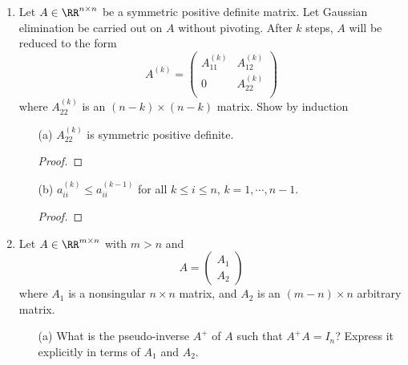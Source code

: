 \documentclass[11pt]{article}
\begin{document}
\begin{enumerate}
    \item %
        Let $A \in \RR^{n \times n}$ be a symmetric positive definite matrix.
        Let Gaussian elimination be carried out on $A$ without pivoting.
        After $k$ steps, $A$ will be reduced to the form
        \[
            A^{(k)} =
            \begin{pmatrix}
                A_{11}^{(k)} & A_{12}^{(k)} \\
                0            & A_{22}^{(k)} \\
            \end{pmatrix}
        \]
        where $A_{22}^{(k)}$ is an $(n - k) \times (n - k)$ matrix.
        Show by induction
        \begin{enumerate}
            \item[(a)]
                $A_{22}^{(k)}$ is symmetric positive definite.

                \begin{proof}
                    
                \end{proof}

            \item[(b)]
                $a_{ii}^{(k)} \le a_{ii}^{(k-1)}$ for all $k \le i \le n$,
                $k = 1, \cdots, n - 1$.

                \begin{proof}
                    
                \end{proof}
        \end{enumerate}

    \item %
        Let $A \in \RR^{m \times n}$ with $m > n$ and
        \[
            A = 
            \begin{pmatrix}
                A_1 \\
                A_2
            \end{pmatrix}
        \]
        where $A_1$ is a nonsingular $n \times n$ matrix, and $A_2$ is an
        $(m - n) \times n$ arbitrary matrix.
        \begin{enumerate}
            \item[(a)] %
                What is the pseudo-inverse $A^+$ of $A$ such that $A^+ A = I_n$?
                Express it explicitly in terms of $A_1$ and $A_2$.


\end{enumerate}
\end{enumerate}
\end{document}

